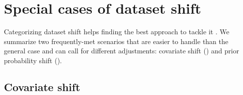 \documentclass[twocolumn]{article}
\begin{document}

\section{Special cases of dataset shift}

Categorizing dataset shift helps finding the best approach to tackle it
\cite{storkey2009training,moreno2012unifying}.
%
We summarize two frequently-met scenarios that are easier to handle than the general case and can call for different adjustments: covariate shift () and prior probability shift ().
%

\subsection{Covariate shift}
\label{sec:covariate-shift}
\end{document}
